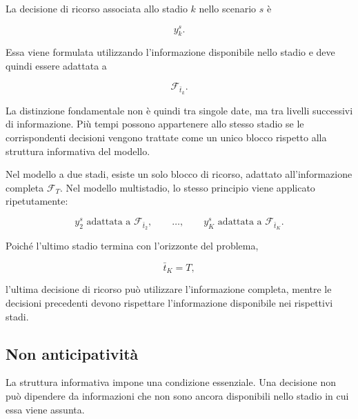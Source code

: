 La decisione di ricorso associata allo stadio $k$ nello scenario $s$ \`e

\[
y_k^s.
\]

Essa viene formulata utilizzando l'informazione disponibile nello stadio e
deve quindi essere adattata a

\[
\mathcal F_{\bar t_k}.
\]

La distinzione fondamentale non \`e quindi tra singole date, ma tra livelli
successivi di informazione. Pi\`u tempi possono appartenere allo stesso
stadio se le corrispondenti decisioni vengono trattate come un unico blocco
rispetto alla struttura informativa del modello.

Nel modello a due stadi, esiste un solo blocco di ricorso, adattato
all'informazione completa $\mathcal F_T$. Nel modello multistadio, lo stesso
principio viene applicato ripetutamente:

\[
y_2^s
\text{ adattata a }
\mathcal F_{\bar t_2},
\qquad
\ldots,
\qquad
y_K^s
\text{ adattata a }
\mathcal F_{\bar t_K}.
\]

Poich\'e l'ultimo stadio termina con l'orizzonte del problema,

\[
\bar t_K=T,
\]

\noindent l'ultima decisione di ricorso pu\`o utilizzare l'informazione completa,
mentre le decisioni precedenti devono rispettare l'informazione disponibile
nei rispettivi stadi.

\subsection{Non anticipativit\`a}

La struttura informativa impone una condizione essenziale. Una decisione non
pu\`o dipendere da informazioni che non sono ancora disponibili nello stadio
in cui essa viene assunta.


